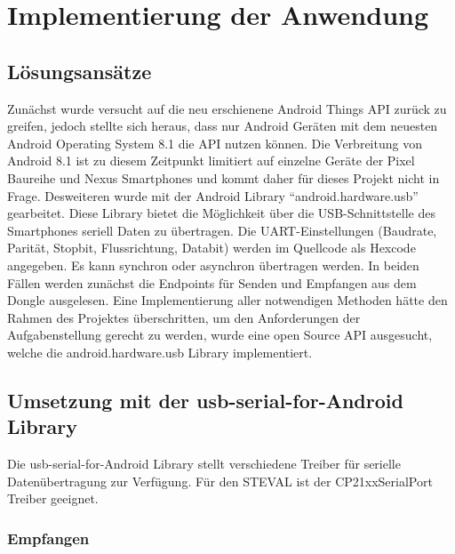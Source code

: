 \documentclass[a4paper, 12.5pt]{scrartcl}
\begin{document}
\section{Implementierung der Anwendung}

\subsection{Lösungsansätze}

Zunächst wurde versucht auf die neu erschienene Android Things API zurück zu greifen, jedoch stellte sich heraus, dass nur Android Geräten mit dem neuesten Android Operating System 8.1 die API nutzen können. Die Verbreitung von Android 8.1 ist zu diesem Zeitpunkt limitiert auf einzelne Geräte der Pixel Baureihe und Nexus Smartphones und kommt daher für dieses Projekt nicht in Frage. Desweiteren wurde mit der Android Library “android.hardware.usb” gearbeitet. Diese Library bietet die Möglichkeit über die USB-Schnittstelle des Smartphones seriell Daten zu übertragen. Die UART-Einstellungen (Baudrate, Parität, Stopbit, Flussrichtung, Databit) werden im Quellcode als Hexcode angegeben. Es kann synchron oder asynchron übertragen werden. In beiden Fällen werden zunächst die Endpoints für Senden und Empfangen aus dem Dongle ausgelesen. Eine Implementierung aller notwendigen Methoden hätte den Rahmen des Projektes überschritten, um den Anforderungen der Aufgabenstellung gerecht zu werden, wurde eine open Source API ausgesucht, welche die android.hardware.usb Library implementiert.

\subsection{Umsetzung mit der usb-serial-for-Android Library}

Die usb-serial-for-Android Library stellt verschiedene Treiber für serielle Datenübertragung zur Verfügung. Für den STEVAL ist der CP21xxSerialPort Treiber geeignet.

\subsubsection{Empfangen}
\end{document}
